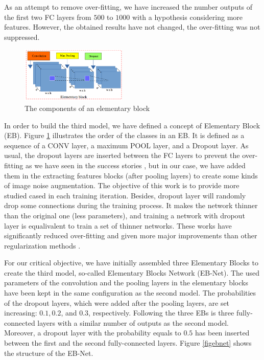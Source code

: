 \documentclass[review]{elsarticle}
\begin{document}
As an attempt to remove over-fitting, we have increased the number outputs of the first two FC layers from $500$ to $1000$ with a hypothesis considering more features. However, the obtained results have not changed, the over-fitting was not suppressed.

\begin{figure}[h!]
	\centering
	\includegraphics[width=0.45\textwidth]{images/elementary_block}
	\caption{The components of an elementary block}
	\label{figeblock}
\end{figure}
In order to build the third model, we have defined a concept of Elementary Block (EB). Figure \ref{figeblock} illustrates the order of the classes in an EB. It is defined as a sequence of a CONV layer, a maximum POOL layer, and a Dropout layer. As usual, the dropout layers are inserted between the FC layers to prevent the over-fitting as we have seen in the success stories \cite{lecun2015deep, krizhevsky2012imagenet}, but in our case, we have added them in the extracting features blocks (after pooling layers) to create some kinds of image noise augmentation. The objective of this work is to provide more studied cased in each training iteration. Besides, dropout layer will randomly drop some connections during the training process. It makes the network thinner than the original one (less parameters), and training a network with dropout layer is equalivalent to train a set of thinner networks. These works have significantly reduced over-fitting and given more major improvements than other regularization methods \cite{srivastava2014dropout}.

For our critical objective, we have initially assembled three Elementary Blocks to create the third model, so-called Elementary Blocks Network (EB-Net). The used parameters of the convolution and the pooling layers in the elementary blocks have been kept in the same configuration as the second model. The probabilities of the dropout layers, which were added after the pooling layers, are set increasing: $0.1, 0.2$, and $0.3$, respectively. Following the three EBs is three fully-connected layers with a similar number of outputs as the second model. Moreover, a dropout layer with the probability equals to $0.5$ has been inserted between the first and the second fully-connected layers. Figure \ref{figebnet} shows the structure of the EB-Net.
\end{document}
